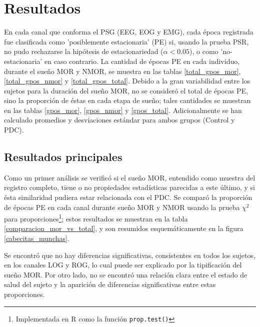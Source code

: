 \documentclass[12pt,a4paper]{mitthesis}
\begin{document}

\chapter{Resultados}

En cada canal que conforma el PSG (EEG, EOG y EMG), cada \'epoca registrada fue clasificada como 
'posiblemente estacionaria' (PE) si, usando la prueba PSR, no pudo rechazarse la hip\'otesis de 
estacionariedad ($\alpha < 0.05$), o como 'no-estacionaria' en caso contrario.
La cantidad de \'epocas PE en cada individuo, durante el sue\~no MOR y NMOR, se muestra en las 
tablas \ref{total_gpos_mor}, \ref{total_gpos_nmor} y \ref{total_gpos_total}. Debido a la gran 
variabilidad entre los sujetos para la duraci\'on del sue\~no MOR, no se consider\'o el total de 
\'epocas PE, sino la proporci\'on de \'estas en cada etapa de sue\~no; tales cantidades se muestran 
en las tablas \ref{gpos_mor}, \ref{gpos_nmor} y \ref{gpos_total}. 
Adicionalmente se han calculado promedios y desviaciones est\'andar para ambos grupos (Control y 
PDC).

\section{Resultados principales}

Como un primer an\'alisis se verific\'o si el sue\~no MOR, entendido como muestra del registro
completo, tiene o no propiedades estad\'isticas parecidas a este \'ultimo, y si \'esta similaridad 
pudiera estar relacionada con el PDC. 
Se compar\'o la proporci\'on de \'epocas PE en cada canal durante sue\~no MOR y NMOR usando la 
prueba $\chi^{2}$ para proporciones\footnote{Implementada en R como la funci\'on 
\texttt{prop.test()}}; estos resultados se muestran en la tabla \ref{comparacion_mor_vs_total},
y son resumidos esquem\'aticamente en la figura \ref{cabecitas_munchas}.

Se encontr\'o que no hay diferencias significativas, consistentes en todos los sujetos, en los 
canales LOG y ROG, lo cual puede ser explicado por la tipificaci\'on del sue\~no MOR. 
Por otro lado, no se encontr\'o una relaci\'on clara entre el estado de salud del sujeto y la 
aparici\'on de diferencias significativas entre estas proporciones.
\end{document}
